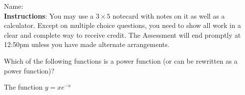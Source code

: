 \documentclass[addpoints]{exam}
\begin{document}
		
\vspace*{0pt}

\noindent
Name: \underline{\hspace{2in}} \\


\noindent
\textbf{Instructions}:  You may use a $3 \times 5$ notecard with notes on it as well as a calculator. Except on multiple choice questions, you need to show all work in a clear and complete way to receive credit. The Assessment will end promptly at 12:50pm unless you have made alternate arrangements. 

\begin{questions}


\question[2] Which of the following functions is a power function (or can be rewritten as a power function)? 



\question[2] The function $y = xe^{-x}$
\end{questions}
\end{document}
